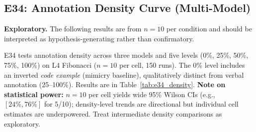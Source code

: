 \subsection{E34: Annotation Density Curve (Multi-Model)}
\label{sec:e34_density}

\label{sec:e28_results}
\textbf{Exploratory.} The following results are from $n=10$ per condition and should be interpreted as hypothesis-generating rather than confirmatory.

E34 tests annotation density across three models and five levels (0\%, 25\%, 50\%, 75\%, 100\%) on L4 Fibonacci ($n{=}10$ per cell, 150 runs). The 0\% level includes an inverted \emph{code example} (mimicry baseline), qualitatively distinct from verbal annotation (25--100\%). Results are in Table~\ref{tab:e34_density}. \textbf{Note on statistical power:} $n{=}10$ per cell yields wide 95\% Wilson CIs (e.g., $[\text{24\%},\text{76\%}]$ for 5/10); density-level trends are directional but individual cell estimates are underpowered. Treat intermediate density comparisons as exploratory.

